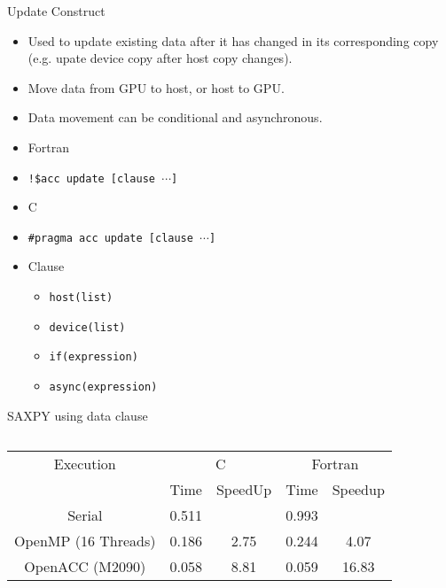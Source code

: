 \documentclass[c,mathserif,compress,xcolor=svgnames]{beamer}
\newenvironment{eblock}[0]
{
\begin{beamerboxesrounded}[upper=uppercol2,lower=lowercol2,shadow=true]}
{\end{beamerboxesrounded}}
\begin{document}
\begin{frame}{\small Update Construct}
  \begin{itemize}
    \item Used to update existing data after it has changed in its corresponding copy (e.g. upate device copy after host copy changes).
    \item Move data from GPU to host, or host to GPU.
    \item Data movement can be conditional and asynchronous.
    \item Fortran
    \item[] \texttt{!\$acc update [clause $\cdots$]}
    \item C
    \item[] \texttt{\#pragma acc update [clause $\cdots$]}
    \item Clause
    \begin{itemize}
      \item \texttt{host(list)}
      \item \texttt{device(list)}
      \item \texttt{if(expression)}
      \item \texttt{async(expression)}
    \end{itemize}
  \end{itemize}
\end{frame}


\begin{frame}{\small SAXPY using data clause}
  \begin{columns}
    \begin{eblock}{}
      
    \end{eblock}
    \begin{eblock}{}
      
    \end{eblock}
  \end{columns}
  \begin{columns}
    \begin{eblock}{}
      \begin{tabular}{|c|c|c|c|c|}
        \hline
        Execution& \multicolumn{2}{c|}{C}& \multicolumn{2}{c|}{Fortran} \\
        \cline{2-5}
        &  Time & SpeedUp & Time & Speedup \\
        \hline
        Serial & 0.511 & & 0.993 & \\
        OpenMP (16 Threads) & 0.186 & 2.75 & 0.244 & 4.07 \\
        OpenACC (M2090) & 0.058 & 8.81 & 0.059 & 16.83 \\
          \hline
      \end{tabular}
    \end{eblock}
  \end{columns}
\end{frame}
\end{document}
